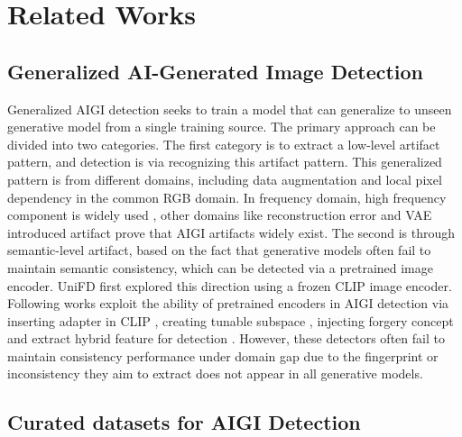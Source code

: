 \section{Related Works}
\subsection{Generalized AI-Generated Image Detection}
    Generalized AIGI detection seeks to train a model that can generalize to unseen generative model from a single training source. The primary approach can be divided into two categories. The first category is to extract a low-level artifact pattern, and detection is via recognizing this artifact pattern. This generalized pattern is from different domains, including data augmentation \cite{wang2020cnn} and local pixel dependency \cite{tan2024rethinking, liang2025ferretnet} in the common RGB domain. In frequency domain, high frequency component is widely used \cite{tan2024frequency, li2025improving, bihpf}, other domains like reconstruction error \cite{wang2023dire, luo2024lare} and VAE introduced artifact \cite{chen2025dda,rajan2025aligned, liu2025beyond} prove that AIGI artifacts widely exist. The second is through semantic-level artifact, based on the fact that generative models often fail to maintain semantic consistency, which can be detected via a pretrained image encoder. UniFD \cite{ojha2023towards} first explored this direction using a frozen CLIP image encoder. Following works exploit the ability of pretrained encoders in AIGI detection via inserting adapter in CLIP \cite{liu2024forgery, li2025towards} , creating tunable subspace \cite{yan2024orthogonal, zhang2025towards, liu2026mirror}, injecting forgery concept \cite{tan2025c2p} and extract hybrid feature for detection \cite{cheng2025co, yan2024sanity}. However, these detectors often fail to maintain consistency performance under domain gap due to the fingerprint or inconsistency they aim to extract does not appear in all generative models.
    
    
\subsection{Curated datasets for AIGI Detection}

